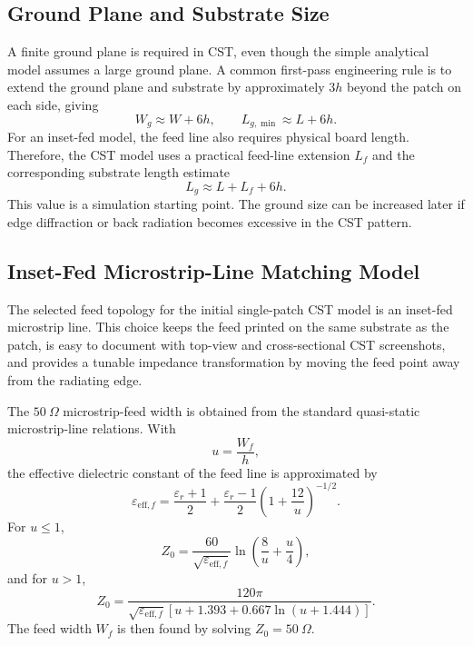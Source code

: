 \subsection{Ground Plane and Substrate Size}
\label{subsec:ground-plane-theory}

A finite ground plane is required in CST, even though the simple analytical model assumes a large
ground plane. A common first-pass engineering rule is to extend the ground plane and substrate by
approximately \(3h\) beyond the patch on each side, giving
\begin{equation}
W_g \approx W+6h, \qquad L_{g,\min}\approx L+6h.
\label{eq:ground-rule}
\end{equation}
For an inset-fed model, the feed line also requires physical board length. Therefore, the CST model
uses a practical feed-line extension \(L_f\) and the corresponding substrate length estimate
\begin{equation}
L_g \approx L+L_f+6h.
\label{eq:ground-rule-with-feed}
\end{equation}
This value is a simulation starting point. The ground size can be increased later if edge diffraction or
back radiation becomes excessive in the CST pattern.

\subsection{Inset-Fed Microstrip-Line Matching Model}
\label{subsec:inset-feed-theory}

The selected feed topology for the initial single-patch CST model is an inset-fed microstrip line. This
choice keeps the feed printed on the same substrate as the patch, is easy to document with top-view
and cross-sectional CST screenshots, and provides a tunable impedance transformation by moving
the feed point away from the radiating edge.

The \(50~\Omega\) microstrip-feed width is obtained from the standard quasi-static microstrip-line
relations. With
\[
    u=\frac{W_f}{h},
\]
the effective dielectric constant of the feed line is approximated by
\begin{equation}
\varepsilon_{\mathrm{eff},f}
=
\frac{\varepsilon_r+1}{2}
+
\frac{\varepsilon_r-1}{2}
\left(1+\frac{12}{u}\right)^{-1/2}.
\label{eq:feed-eeff}
\end{equation}
For \(u\le1\),
\begin{equation}
Z_0=\frac{60}{\sqrt{\varepsilon_{\mathrm{eff},f}}}
\ln\left(\frac{8}{u}+\frac{u}{4}\right),
\label{eq:microstrip-z0-narrow}
\end{equation}
and for \(u>1\),
\begin{equation}
Z_0=\frac{120\pi}{\sqrt{\varepsilon_{\mathrm{eff},f}}
\left[u+1.393+0.667\ln(u+1.444)\right]}.
\label{eq:microstrip-z0-wide}
\end{equation}
The feed width \(W_f\) is then found by solving \(Z_0=50~\Omega\).

